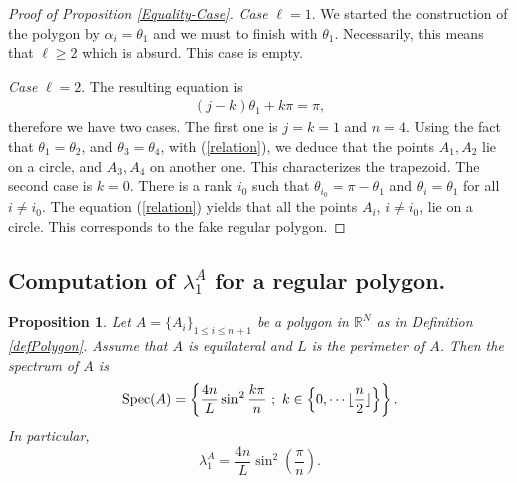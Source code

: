 \documentclass[12pt,english]{smfart} %
\newtheorem{proposition}[theorem]{Proposition}
\theoremstyle{remark}
\newcommand{\R}{\mathbb{R}}
\begin{document}
\begin{proof}[Proof of Proposition \ref{Equality-Case}]
\emph{Case} $\ell=1$. We started the construction of the polygon by $\alpha_i=\theta_1$ and we must to finish with $\theta_1$. Necessarily, this means that $\ell\geqslant 2$ which is absurd. This case is empty.


\emph{Case} $\ell=2$. The resulting equation is 
\begin{align*}
    (j-k)\theta_1 + k\pi = \pi,
\end{align*}
therefore we have two cases. The first one is $j=k=1$ and $n=4$. Using the fact that $\theta_1 = \theta_2$, and $\theta_3 = \theta_4$, with (\ref{relation}), we deduce that the points $A_1, A_2$ lie on a circle, and $A_3,A_4$ on another one. This characterizes the trapezoid. The second case is $k=0$. There is a rank $i_0$ such that $\theta_{i_0} = \pi-\theta_1$ and $\theta_i = \theta_1$ for all $i\ne i_0$. The equation (\ref{relation}) yields that all the points $A_i$, $i\ne i_0$, lie on a circle. This corresponds to the fake regular polygon.
\end{proof}
  
  
\subsection{Computation of $\lambda_1^A$ for a regular polygon.} 
 



\medskip\begin{proposition}\label{Spectrum-Equilateral-Gon} Let $A=\{A_i\}_{1\leqslant i \leqslant n+1}$ be a polygon in $\R^N$ as in Definition \ref{defPolygon}. Assume that $A$ is equilateral and $L$ is the perimeter of $A$. Then  the spectrum of $A$ is 
$$\textnormal{Spec}(A)=\left\{\frac{4n}{L}\sin^2\frac{k\pi}{n}\ ; \ k\in\left\{0,\cdots\lfloor\dfrac{n}{2}\rfloor\right\}\right\}.$$
In particular,
$$\lambda_1^A=\frac{4n}{L}\sin^2\left(\frac{\pi}{n}\right).$$
\end{proposition}
\end{document}
